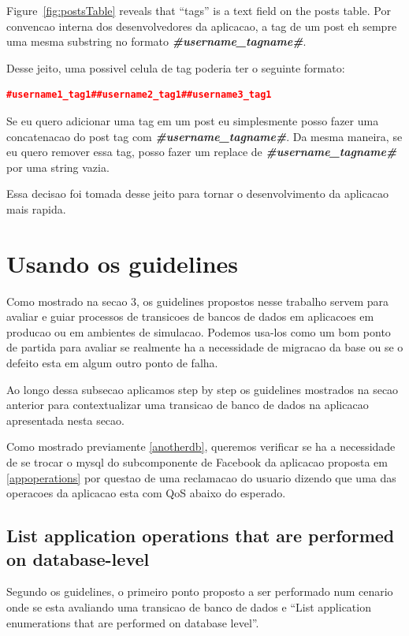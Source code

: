 Figure~\ref{fig:postsTable} reveals that ``tags'' is a text field on the posts table. Por convencao interna dos desenvolvedores da aplicacao, a tag de um post eh sempre uma mesma substring no formato \textbf{\textit{\#username\_tagname\#}}.

Desse jeito, uma possivel celula de tag poderia ter o seguinte formato: 

\begin{lstlisting}[language=json,firstnumber=1, caption=Tag field standard format, label=tag_field_standard_format]
#username1_tag1##username2_tag1##username3_tag1 
\end{lstlisting}

Se eu quero adicionar uma tag em um post eu simplesmente posso fazer uma concatenacao do post tag com \textbf{\textit{\#username\_tagname\#}}. Da mesma maneira, se eu quero remover essa tag, posso fazer um replace de \textbf{\textit{\#username\_tagname\#}} por uma string vazia.

Essa decisao foi tomada desse jeito para tornar o desenvolvimento da aplicacao mais rapida.


\section{Usando os guidelines}
Como mostrado na secao 3, os guidelines propostos nesse trabalho servem para avaliar e guiar processos de transicoes de bancos de dados em aplicacoes em producao ou em ambientes de simulacao. Podemos usa-los como um bom ponto de partida para avaliar se realmente ha a necessidade de migracao da base ou se o defeito esta em algum outro ponto de falha. 

Ao longo dessa subsecao aplicamos step by step os guidelines mostrados na secao anterior para contextualizar uma transicao de banco de dados na aplicacao apresentada nesta secao. 

Como mostrado previamente \ref{anotherdb}, queremos verificar se ha a necessidade de se trocar o mysql do subcomponente de Facebook da aplicacao proposta em \ref{appoperations} por questao de uma reclamacao do usuario dizendo que uma das operacoes da aplicacao esta com QoS abaixo do esperado.  

\subsection{List application operations that are performed on database-level}
Segundo os guidelines, o primeiro ponto proposto a ser performado num  cenario onde se esta avaliando uma transicao de banco de dados e ``List application enumerations that are performed on database level''. 

